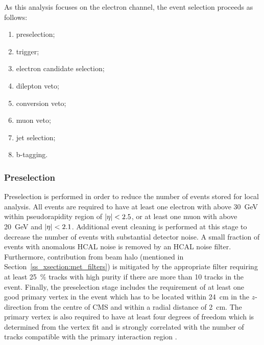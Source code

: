 
As this analysis focuses on the electron channel, the event selection proceeds as follows:

\begin{enumerate}[topsep=\parskip, parsep=\parskip, itemsep=\parskip, leftmargin=\leftmargin]
	\item preselection;
	\item trigger;
	\item electron candidate selection;
	\item dilepton veto;
	\item conversion veto;
	\item muon veto;
	\item jet selection;
	\item b-tagging.
\end{enumerate}

\subsubsection*{Preselection}
Preselection is performed in order to reduce the number of events stored for local analysis. All events are required to
have at least one electron with \ET above \SI{30}{\GeV} within pseudorapidity region of $\lvert \eta \rvert < 2.5$, or at least
one muon with \pt above \SI{20}{\GeV} and $\lvert \eta \rvert < 2.1$. Additional event cleaning is performed at this stage to
decrease the number of events with substantial detector noise. A small fraction of events with anomalous HCAL noise is
removed by an HCAL noise filter. Furthermore, contribution from beam halo (mentioned in
Section~\ref{ss_xsection:met_filters}) is mitigated by the appropriate filter requiring at least \SI{25}{\percent}
tracks with high purity if there are more than \num{10} tracks in the event. Finally, the preselection stage includes
the requirement of at least one good primary vertex in the event which has to be located within
\SI{24}{\cm} in the $z$-direction from the centre of CMS and within a radial distance of \SI{2}{\cm}. The primary vertex
is also required to have at least four degrees of freedom which is determined from the vertex fit and is strongly
correlated with the number of tracks compatible with the primary interaction region \autocite{Tacking_PV_results_7TeV}.


